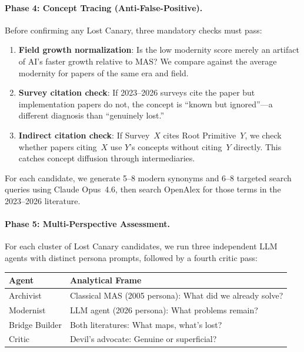 \documentclass{article}
\begin{document}
\paragraph{Phase 4: Concept Tracing (Anti-False-Positive).}
Before confirming any Lost Canary, three mandatory checks must pass:
\begin{enumerate}[nosep]
  \item \textbf{Field growth normalization}: Is the low modernity score merely an
    artifact of AI's faster growth relative to MAS? We compare against the average
    modernity for papers of the same era and field.
  \item \textbf{Survey citation check}: If 2023--2026 surveys cite the paper but
    implementation papers do not, the concept is ``known but ignored''---a different
    diagnosis than ``genuinely lost.''
  \item \textbf{Indirect citation check}: If Survey~$X$ cites Root Primitive~$Y$,
    we check whether papers citing~$X$ use $Y$'s concepts without citing~$Y$ directly.
    This catches concept diffusion through intermediaries.
\end{enumerate}
For each candidate, we generate 5--8 modern synonyms and 6--8 targeted search queries
using Claude Opus~4.6, then search OpenAlex for those terms in the 2023--2026 literature.

\paragraph{Phase 5: Multi-Perspective Assessment.}
For each cluster of Lost Canary candidates, we run three independent LLM agents with
distinct persona prompts, followed by a fourth critic pass:

\begin{center}
\small
\begin{tabular}{@{} l p{5.5cm} @{}}
\toprule
\textbf{Agent} & \textbf{Analytical Frame} \\
\midrule
Archivist & Classical MAS (2005 persona): What did we already solve? \\
Modernist & LLM agent (2026 persona): What problems remain? \\
Bridge Builder & Both literatures: What maps, what's lost? \\
Critic & Devil's advocate: Genuine or superficial? \\
\bottomrule
\end{tabular}
\end{center}
\end{document}
